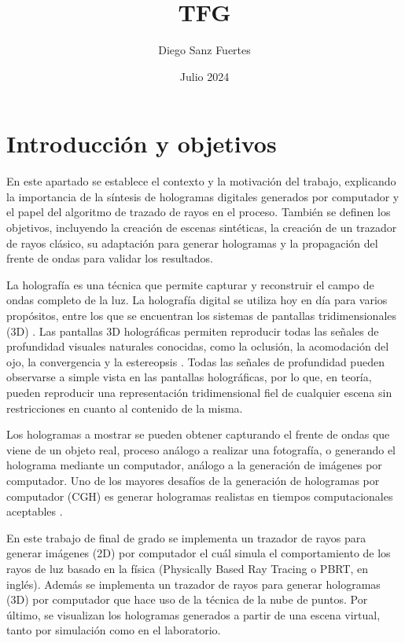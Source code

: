 \documentclass[10pt, a4paper]{article}
\title{TFG}
\author{Diego Sanz Fuertes}
\date{Julio 2024}
\begin{document}
\maketitle
\titlepage
\tableofcontents
\newpage

\section{Introducción y objetivos}

En este apartado se establece el contexto y la motivación del trabajo, explicando la importancia de la síntesis de hologramas digitales generados por computador y el papel del algoritmo de trazado de rayos en el proceso. También se definen los objetivos, incluyendo la creación de escenas sintéticas, la creación de un trazador de rayos clásico, su adaptación para generar hologramas y la propagación del frente de ondas para validar los resultados.

La holografía es una técnica que permite capturar y reconstruir el campo de ondas completo de la luz. \cite{Goodman:2017} La holografía digital se utiliza hoy en día para varios propósitos, entre los que se encuentran los sistemas de pantallas tridimensionales (3D) \cite{Blinder:2019}. Las pantallas 3D holográficas permiten reproducir todas las señales de profundidad visuales naturales conocidas, como la oclusión, la acomodación del ojo, la convergencia y la estereopsis \cite{Blinder:2022}. Todas las señales de profundidad pueden observarse a simple vista en las pantallas holográficas, por lo que, en teoría, pueden reproducir una representación tridimensional fiel de cualquier escena sin restricciones en cuanto al contenido de la misma.

Los hologramas a mostrar se pueden obtener capturando el frente de ondas que viene de un objeto real, proceso análogo a realizar una fotografía, o generando el holograma mediante un computador, análogo a la generación de imágenes por computador. Uno de los mayores desafíos de la generación de hologramas por computador (CGH) es generar hologramas realistas en tiempos computacionales aceptables \cite{Blinder:2019}.

En este trabajo de final de grado se implementa un trazador de rayos para generar imágenes (2D) por computador el cuál simula el comportamiento de los rayos de luz basado en la física (Physically Based Ray Tracing o PBRT, en inglés). Además se implementa un trazador de rayos para generar hologramas (3D) por computador que hace uso de la técnica de la nube de puntos. Por último, se visualizan los hologramas generados a partir de una escena virtual, tanto por simulación como en el laboratorio.
\end{document}
